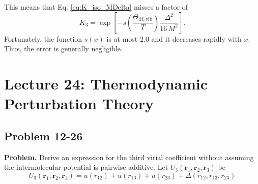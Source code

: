 \documentclass[twocolumn, 10pt]{article}
\numberwithin{equation}{section}
\newenvironment{problem}
{\par\medskip \color{problue}
  \textbf{Problem. }\ignorespaces}
{\medskip}
\newenvironment{solution}[1][\empty]
{\par\medskip\sffamily
  \textbf{\ifx\empty#1{Solution.}\relax\else{#1}\fi} \ignorespaces}
{\medskip}
\begin{document}
\begin{solution}
  This means that Eq. \eqref{eq:K_iso_MDelta}
  misses a factor of
  $$
  K_3
  =
  \exp\left[
    -s\left( \frac{ \Theta_{M, \mathrm{vib}} } { T } \right)
    \frac{ \Delta^2 } { 16 \, M^2 }
    \right].
  $$
  Fortunately,
  the function $s(x)$ is at most $2.0$
  and it decreases rapidly with $x$.
  Thus, the error is generally negligible.

\end{solution}


\section{Lecture 24: Thermodynamic Perturbation Theory}

\subsection{Problem 12-26}

\begin{problem}
  Derive an expression for the third virial coefficient
  without assuming the intermolecular potential is pairwise
  additive. Let $U_3(\mathbf r_1, \mathbf r_2, \mathbf r_3)$ be
  $$
  U_3(\mathbf r_1, \mathbf r_2, \mathbf r_3)
  =
  u(r_{12}) + u(r_{13}) + u(r_{23})
  + \Delta(r_{12}, r_{13}, r_{23})
  $$
\end{problem}
\end{document}
